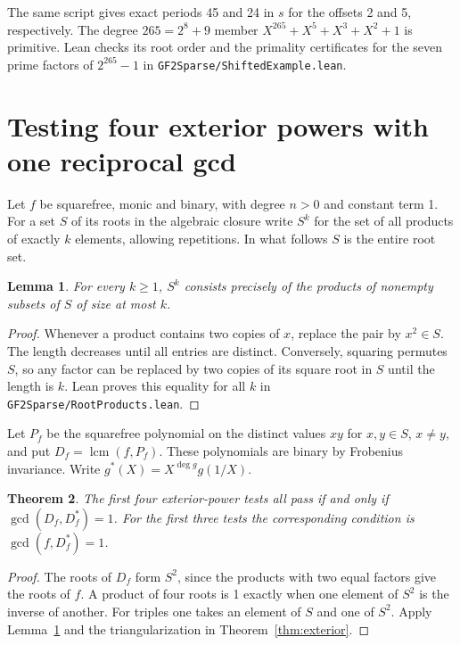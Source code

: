 \documentclass[11pt]{article}
\newtheorem{theorem}{Theorem}
\newtheorem{lemma}[theorem]{Lemma}
\begin{document}
The same script gives exact periods 45 and 24 in \(s\) for the
offsets 2 and 5, respectively. The degree \(265=2^8+9\) member
\(X^{265}+X^5+X^3+X^2+1\) is primitive. Lean checks its root order and the
primality certificates for the seven prime factors of \(2^{265}-1\) in
\texttt{GF2Sparse/ShiftedExample.lean}.

\section{Testing four exterior powers with one reciprocal gcd}
Let \(f\) be squarefree, monic and binary, with degree \(n>0\) and
constant term 1. For a set \(S\) of its roots in the algebraic closure
write \(S^k\) for the set of all products of exactly \(k\) elements,
allowing repetitions. In what follows \(S\) is the entire root set.
\begin{lemma}\label{lem:short-products}
For every \(k\ge1\), \(S^k\) consists precisely of the products of
nonempty subsets of \(S\) of size at most \(k\).
\end{lemma}
\begin{proof}
Whenever a product contains two copies of \(x\), replace the pair
by \(x^2\in S\). The length decreases until all entries are distinct.
Conversely, squaring permutes \(S\), so any factor can be replaced by
two copies of its square root in \(S\) until the length is \(k\).
Lean proves this equality for all \(k\) in
\texttt{GF2Sparse/RootProducts.lean}.
\end{proof}
Let \(P_f\) be the squarefree polynomial on the distinct values
\(xy\) for \(x,y\in S\), \(x\ne y\), and put
\(D_f=\operatorname{lcm}(f,P_f)\). These polynomials are binary by
Frobenius invariance. Write \(g^*(X)=X^{\deg g}g(1/X)\).

\begin{theorem}\label{thm:pair-products}
The first four exterior-power tests all pass if and only if
\(\gcd(D_f,D_f^*)=1\). For the first three tests the corresponding
condition is \(\gcd(f,D_f^*)=1\).
\end{theorem}
\begin{proof}
The roots of \(D_f\) form \(S^2\), since the products with two equal
factors give the roots of \(f\). A product of four roots is 1 exactly
when one element of \(S^2\) is the inverse of another. For triples
one takes an element of \(S\) and one of \(S^2\). Apply
Lemma~\ref{lem:short-products} and the triangularization in
Theorem~\ref{thm:exterior}.
\end{proof}
\end{document}
